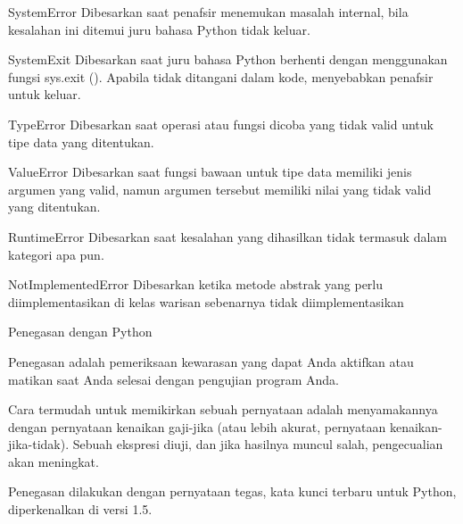 \vspace{12pt}
SystemError \hspace*{0.5in} Dibesarkan saat penafsir menemukan masalah internal, bila kesalahan ini ditemui juru bahasa Python tidak keluar. \par
\vspace{12pt}
SystemExit \hspace*{0.5in} Dibesarkan saat juru bahasa Python berhenti dengan menggunakan fungsi sys.exit (). Apabila tidak ditangani dalam kode, menyebabkan penafsir untuk keluar. \par
\vspace{12pt}
TypeError \hspace*{0.5in} Dibesarkan saat operasi atau fungsi dicoba yang tidak valid untuk tipe data yang ditentukan. \par
\vspace{12pt}
ValueError \hspace*{0.5in} Dibesarkan saat fungsi bawaan untuk tipe data memiliki jenis argumen yang valid, namun argumen tersebut memiliki nilai yang tidak valid yang ditentukan. \par
\vspace{12pt}
RuntimeError \hspace*{0.5in} Dibesarkan saat kesalahan yang dihasilkan tidak termasuk dalam kategori apa pun. \par
\vspace{12pt}
NotImplementedError \hspace*{0.5in} Dibesarkan ketika metode abstrak yang perlu diimplementasikan di kelas warisan sebenarnya tidak diimplementasikan \par
\vspace{12pt}
Penegasan dengan Python \par
\vspace{12pt}
Penegasan adalah pemeriksaan kewarasan yang dapat Anda aktifkan atau matikan saat Anda selesai dengan pengujian program Anda. \par
\vspace{12pt}
Cara termudah untuk memikirkan sebuah pernyataan adalah menyamakannya dengan pernyataan kenaikan gaji-jika (atau lebih akurat, pernyataan kenaikan-jika-tidak). Sebuah ekspresi diuji, dan jika hasilnya muncul salah, pengecualian akan meningkat. \par
\vspace{12pt}
Penegasan dilakukan dengan pernyataan tegas, kata kunci terbaru untuk Python, diperkenalkan di versi 1.5. \par
